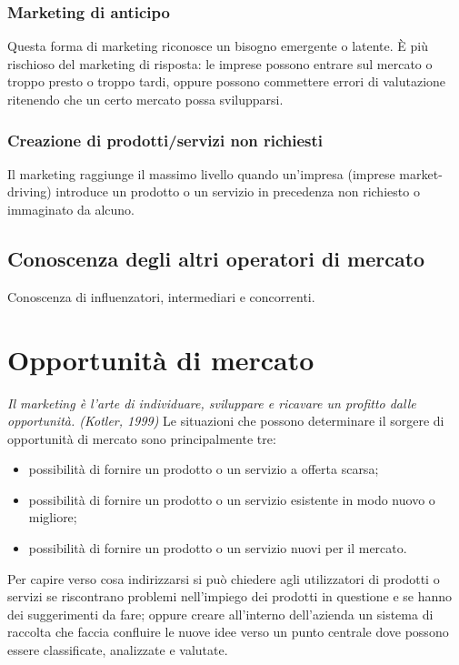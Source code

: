\subsubsection*{Marketing di anticipo}
Questa forma di marketing riconosce un bisogno emergente o latente. È più rischioso del marketing di risposta: le imprese possono entrare sul mercato o troppo presto o troppo tardi, oppure possono commettere errori di valutazione ritenendo che un certo mercato possa svilupparsi.

\subsubsection*{Creazione di prodotti/servizi non richiesti}
Il marketing raggiunge il massimo livello quando un’impresa (imprese market-driving) introduce un prodotto o un servizio in precedenza non richiesto o immaginato da alcuno.

\subsection{Conoscenza degli altri operatori di mercato}
Conoscenza di influenzatori, intermediari e concorrenti.

\section{Opportunità di mercato}
\textit{Il marketing è l’arte di individuare, sviluppare e ricavare un profitto dalle opportunità. (Kotler, 1999) } \newline
Le situazioni che possono determinare il sorgere di opportunità di mercato sono principalmente tre:
\begin{itemize} 
	\item possibilità di fornire un prodotto o un servizio a offerta scarsa;
	\item possibilità di fornire un prodotto o un servizio esistente in modo nuovo o migliore;
	\item possibilità di fornire un prodotto o un servizio nuovi per il mercato.
\end{itemize}

Per capire verso cosa indirizzarsi si può chiedere agli utilizzatori di prodotti o servizi se riscontrano problemi nell’impiego dei prodotti in questione e se hanno dei suggerimenti da fare; oppure creare all’interno dell’azienda un sistema di raccolta che faccia confluire le nuove idee verso un punto centrale dove possono essere classificate, analizzate e valutate.


